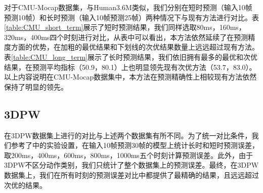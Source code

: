 对于CMU-Mocap数据集，与Human3.6M类似，我们分别在短时预测（输入10帧预测10帧）和长时预测（输入10帧预测25帧）两种情况下与现有方法进行对比。表\ref{table:CMU_short_term}展示了短时预测结果，我们同样选取80ms，160ms，320ms，400ms四个时刻进行对比，从表中可以看出，本方法依然延续了在预测精度方面的优势，在加粗的最优结果和下划线的次优结果数量上远远超过现有方法。表\ref{table:CMU_long_term}展示了长时预测结果，我们依旧拥有最多的最优和次优结果，在预测平均指标（50.9，80.1）上也明显领先现有次优方法（53.7，83.0）。以上内容说明在CMU-Mocap数据集中，本方法在预测精确性上相较现有方法依然保持了明显的领先。

\begin{table}[ht]
    \caption{3DPW上的长短时预测误差对比}
    \huge
    \centering
    \renewcommand\arraystretch{0.7}
    \label{table:3DPW_shortlong}
    \end{table}

\subsection{3DPW}
在3DPW数据集上进行的对比与上述两个数据集有所不同。为了统一对比条件，我们参考了\parencite{mao2019learning}中的实验设置，在输入10帧预测30帧的模型上统计长时和短时预测误差，取200ms，400ms，600ms，800ms，1000ms五个时刻计算预测误差。此外，由于3DPW不区分动作类别，我们只统计了整个数据集上的预测误差。最终，在3DPW数据集上，我们在所有时刻的预测误差对比中都提供了最精确的结果，且远远超过次优的结果。


